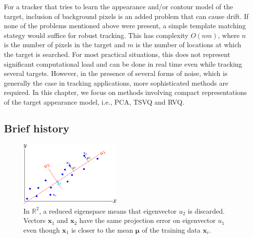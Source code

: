 For a tracker that tries to learn the appearance and/or contour model of the target, inclusion of background pixels is an added problem that can cause drift.  If none of the problems mentioned above were present, a simple template matching stategy would suffice for robust tracking.  This has complexity $O(nm)$, where $n$ is the number of pixels in the target and $m$ is the number of locations at which the target is searched.  For most practical situations, this does not represent significant computational load and can be done in real time even while tracking several targets.  However, in the presence of several forms of noise, which is generally the case in tracking applications, more sophisticated methods are required.  In this chapter, we focus on methods involving compact representations of the target appearance model, i.e., PCA, TSVQ and RVQ.



\subsection{Brief history}
								\begin{figure}[t]
								\centering
								\includegraphics[width=0.45\textwidth]{thesis/PRML_PCA_problem.pdf}
								\caption{In $\mathbb{R}^2$, a reduced eigenspace means that eigenvector $u_2$ is discarded.  Vectors $\mathbf{x}_1$ and $\mathbf{x}_2$ have the same projection error on eigenvector $u_1$ even though $\mathbf{x}_1$ is closer to the mean $\boldsymbol\mu$ of the training data $\mathbf{x}_i$.}
								\label{fig:PRML_PCA_problem}
								\end{figure}

